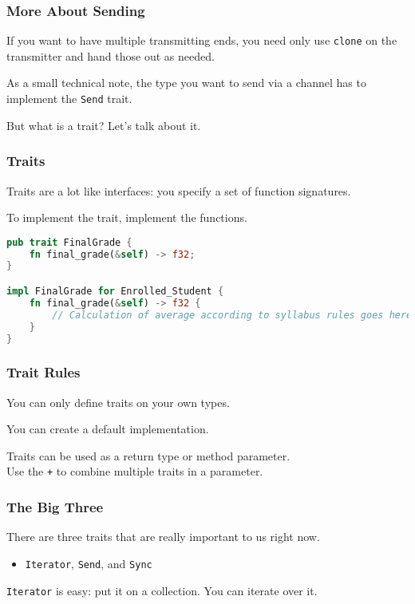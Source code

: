 \begin{frame}
\frametitle{More About Sending}

If you want to have multiple transmitting ends, you need only use \texttt{clone} on the transmitter and hand those out as needed. 


As a small technical note, the type you want to send via a channel has to implement the \texttt{Send} trait.

But what is a trait? Let's talk about it.

\end{frame}


\begin{frame}[fragile]
\frametitle{Traits}

Traits are a lot like interfaces: you specify a set of function signatures.

To implement the trait, implement the functions.

\begin{lstlisting}[language=Rust]
pub trait FinalGrade {
	fn final_grade(&self) -> f32;
}

impl FinalGrade for Enrolled_Student {
    fn final_grade(&self) -> f32 {
        // Calculation of average according to syllabus rules goes here
    }	
}  
\end{lstlisting}

\end{frame}

\begin{frame}
\frametitle{Trait Rules}

You can only define traits on your own types.

You can create a default implementation.

Traits can be used as a return type or method parameter.\\
\quad Use the \texttt{+} to combine multiple traits in a parameter.

\end{frame}


\begin{frame}
\frametitle{The Big Three}

There are three traits that are really important to us right now. 

\begin{itemize}
\item \texttt{Iterator}, \texttt{Send}, and \texttt{Sync}
\end{itemize}


\texttt{Iterator} is easy: put it on a collection. You can iterate over it.
\end{frame}


